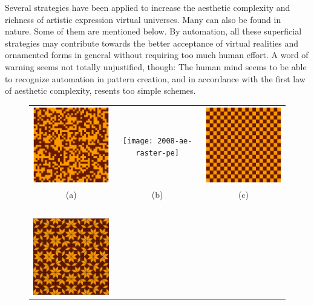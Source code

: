 \documentclass[%
 reprint,
 showpacs,
 showkeys,
 amsmath,
 amssymb,
 aps,
 pra,
 longbibliography,
 floatfix,
 ]{revtex4-1}
\begin{document}
Several strategies have been applied to increase the aesthetic complexity
and richness of artistic expression virtual universes. Many can also be found in nature. Some of
them are mentioned below. By automation, all these superficial strategies
may contribute towards the better acceptance of virtual realities and
ornamented forms in general without requiring too much human effort.
A word of warning seems not totally unjustified, though:
The human mind seems to be able to recognize automation in pattern creation, and in accordance
with the first law of aesthetic complexity, resents too simple schemes.



\begin{figure}
\begin{center}
\begin{tabular}{ccc}
 \includegraphics[width=5.23cm]{2008-ae-random}
&
 \texttt{[image: 2008-ae-raster-pe]}
&
 \includegraphics[width=5.23cm]{2008-ae-raster-diag}
\\
(a)&(b)&(c) \\
$\;$\\
 \includegraphics[width=5.00cm]{2008-ae-tiling}

\end{tabular}
\end{center}
\end{figure}
\end{document}
